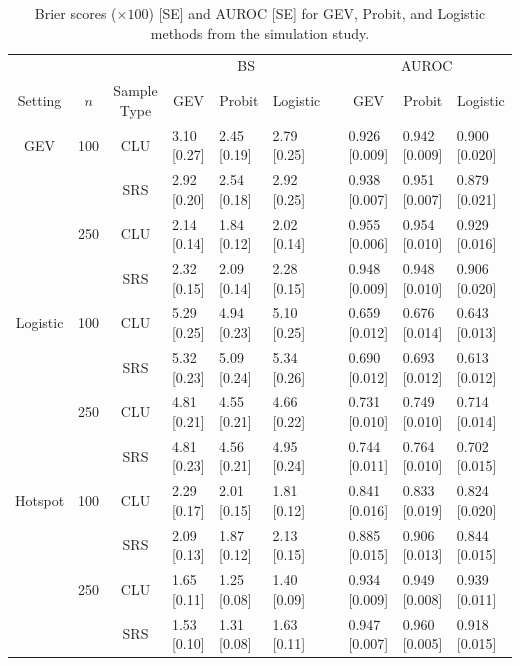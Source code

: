 \documentclass[11pt]{article}
\begin{document}
\begin{table}
  \caption{Brier scores ($\times 100$) [SE] and AUROC [SE] for GEV, Probit, and Logistic methods from the simulation study.}
  \label{rbtbl:simbsresults}
  \centering
  \scriptsize
  \begin{tabular}{ccclllclll}
  \toprule
    \multicolumn{3}{c}{ }& \multicolumn{3}{c}{BS} & \phantom{abc} & \multicolumn{3}{c}{AUROC}\\
    \cmidrule{4-6} \cmidrule{8-10}
    \multicolumn{1}{c}{Setting} & \multicolumn{1}{c}{$n$} & \multicolumn{1}{c}{Sample Type} & \multicolumn{1}{c}{GEV}    & \multicolumn{1}{c}{Probit} & \multicolumn{1}{c}{Logistic} & \phantom{abc} & \multicolumn{1}{c}{GEV}    & \multicolumn{1}{c}{Probit} & \multicolumn{1}{c}{Logistic} \\
  \midrule
  GEV & 100 & CLU & 3.10 [0.27] & 2.45 [0.19] & 2.79 [0.25] && 0.926 [0.009] &
      0.942 [0.009] & 0.900 [0.020]\\
      &     & SRS & 2.92 [0.20] & 2.54 [0.18] & 2.92 [0.25] && 0.938 [0.007] & 0.951 [0.007] & 0.879 [0.021]\\
      & 250 & CLU & 2.14 [0.14] & 1.84 [0.12] & 2.02 [0.14] && 0.955 [0.006] & 0.954 [0.010] & 0.929 [0.016]\\
      &     & SRS & 2.32 [0.15] & 2.09 [0.14] & 2.28 [0.15] && 0.948 [0.009] & 0.948 [0.010] & 0.906 [0.020]\\
  \midrule
  Logistic & 100 & CLU & 5.29 [0.25] & 4.94 [0.23] & 5.10 [0.25] && 0.659 [0.012]
           & 0.676 [0.014] & 0.643 [0.013]\\
           &     & SRS & 5.32 [0.23] & 5.09 [0.24] & 5.34 [0.26] && 0.690 [0.012] & 0.693 [0.012] & 0.613 [0.012]\\
           & 250 & CLU & 4.81 [0.21] & 4.55 [0.21] & 4.66 [0.22] && 0.731 [0.010] & 0.749 [0.010] & 0.714 [0.014]\\
           &     & SRS & 4.81 [0.23] & 4.56 [0.21] & 4.95 [0.24] && 0.744 [0.011] & 0.764 [0.010] & 0.702 [0.015]\\
  \midrule
  Hotspot & 100 & CLU & 2.29 [0.17] & 2.01 [0.15] & 1.81 [0.12] && 0.841 [0.016] &        0.833 [0.019] & 0.824 [0.020]\\
          &     & SRS & 2.09 [0.13] & 1.87 [0.12] & 2.13 [0.15] && 0.885 [0.015] &  0.906 [0.013] & 0.844 [0.015]\\
          & 250 & CLU & 1.65 [0.11] & 1.25 [0.08] & 1.40 [0.09] && 0.934 [0.009] &  0.949 [0.008] & 0.939 [0.011]\\
          &     & SRS & 1.53 [0.10] & 1.31 [0.08] & 1.63 [0.11] && 0.947 [0.007] &  0.960 [0.005] & 0.918 [0.015]\\
  \bottomrule
  \end{tabular}
\end{table}
\end{document}
